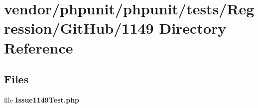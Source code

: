 \section{vendor/phpunit/phpunit/tests/\+Regression/\+Git\+Hub/1149 Directory Reference}
\label{dir_04493c58a5bc6a1eed22b3fed177ea13}
\subsection*{Files}
\begin{DoxyCompactItemize}
\item 
file {\bf Issue1149\+Test.\+php}
\end{DoxyCompactItemize}
